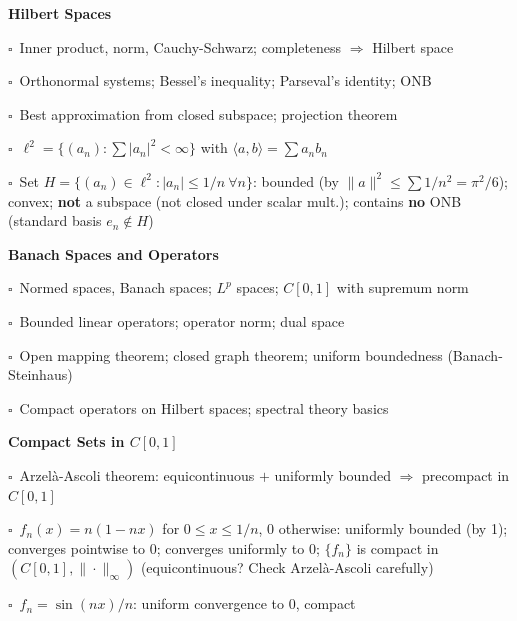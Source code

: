\documentclass[11pt,a4paper]{article}
\newcommand{\chk}{\textcolor{rulegray}{$\square$}\ }
\begin{document}
\begin{subtopics}

  \item \textbf{Hilbert Spaces}
  \begin{subtopics}
    \item \chk Inner product, norm, Cauchy-Schwarz; completeness $\Rightarrow$ Hilbert space
    \item \chk Orthonormal systems; Bessel's inequality; Parseval's identity; ONB
    \item \chk Best approximation from closed subspace; projection theorem
    \item \chk $\ell^2=\{(a_n):\sum|a_n|^2<\infty\}$ with $\langle a,b\rangle=\sum a_nb_n$
    \item \chk Set $H=\{(a_n)\in\ell^2:|a_n|\le 1/n\ \forall n\}$: bounded (by $\|a\|^2\le\sum 1/n^2=\pi^2/6$); convex; \textbf{not} a subspace (not closed under scalar mult.); contains \textbf{no} ONB (standard basis $e_n\notin H$)
  \end{subtopics}

  \item \textbf{Banach Spaces and Operators}
  \begin{subtopics}
    \item \chk Normed spaces, Banach spaces; $L^p$ spaces; $C[0,1]$ with supremum norm
    \item \chk Bounded linear operators; operator norm; dual space
    \item \chk Open mapping theorem; closed graph theorem; uniform boundedness (Banach-Steinhaus)
    \item \chk Compact operators on Hilbert spaces; spectral theory basics
  \end{subtopics}

  \item \textbf{Compact Sets in $C[0,1]$}
  \begin{subtopics}
    \item \chk Arzelà-Ascoli theorem: equicontinuous $+$ uniformly bounded $\Rightarrow$ precompact in $C[0,1]$
    \item \chk $f_n(x)=n(1-nx)$ for $0\le x\le 1/n$, 0 otherwise: uniformly bounded (by 1); converges pointwise to 0; converges uniformly to 0; $\{f_n\}$ is compact in $(C[0,1],\|\cdot\|_\infty)$ (equicontinuous? Check Arzelà-Ascoli carefully)
    \item \chk $f_n=\sin(nx)/n$: uniform convergence to 0, compact
  \end{subtopics}

\end{subtopics}
\end{document}
